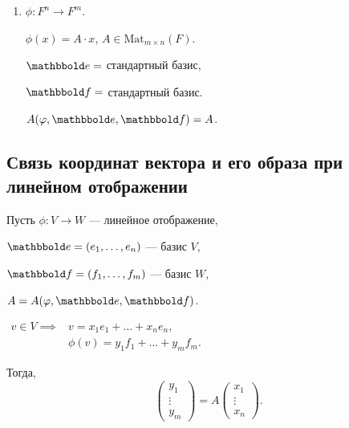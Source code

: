 \begin{enumerate}[start=0]
\item $\phi: F^n \to F^m$.

    $\phi(x) = A \cdot x$, $A \in \text{Mat}_{m \times n}(F)$.

    $\E = $ стандартный базис,

    $\F = $ стандартный базис.

    $A(\phi, \E, \F) = A$.
\end{enumerate}


\subsection{Связь координат вектора и его образа при линейном отображении}

\begin{proposal}
    Пусть $\phi : V \to W$ --- линейное отображение,

    $\E = (e_1, \dots, e_n)$ --- базис $V$,

    $\F = (f_1, \dots, f_m)$ --- базис $W$,

    $A = A(\phi, \E, \F)$.

    \begin{math}
        \begin{aligned}
            v \in V \implies &v = x_1 e_1 + \dots + x_n e_n, \\
            &\phi(v) = y_1 f_1 + \dots + y_m f_m.
        \end{aligned}
    \end{math}

    Тогда,
    \begin{equation*}
        \begin{pmatrix} y_1 \\ \vdots \\ y_m \end{pmatrix} = A \begin{pmatrix} x_1 \\ \vdots \\ x_n \end{pmatrix}
    .\end{equation*}
\end{proposal}

